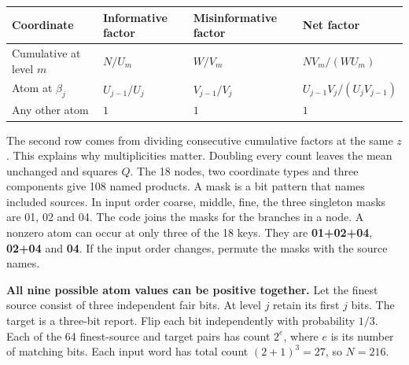 {\def\LTcaptype{none} %
\begin{longtable}[]{@{}
  >{\raggedright\arraybackslash}p{}
  >{\raggedright\arraybackslash}p{}
  >{\raggedright\arraybackslash}p{}
  >{\raggedright\arraybackslash}p{}@{}}
\toprule\noalign{}
\begin{minipage}[b]{\linewidth}\raggedright
Coordinate
\end{minipage} & \begin{minipage}[b]{\linewidth}\raggedright
Informative factor
\end{minipage} & \begin{minipage}[b]{\linewidth}\raggedright
Misinformative factor
\end{minipage} & \begin{minipage}[b]{\linewidth}\raggedright
Net factor
\end{minipage} \\
\midrule\noalign{}
\endhead
\bottomrule\noalign{}
\endlastfoot
Cumulative at level \(m\) & \(N/U_m\) & \(W/V_m\) & \(NV_m/(WU_m)\) \\
Atom at \(\beta_j\) & \(U_{j-1}/U_j\) & \(V_{j-1}/V_j\) & \(U_{j-1}V_j/(U_jV_{j-1})\) \\
Any other atom & \(1\) & \(1\) & \(1\) \\
\end{longtable}
}

The second row comes from dividing consecutive cumulative factors at the same \(z\). This explains why multiplicities matter. Doubling every count leaves the mean unchanged and squares \(Q\). The 18 nodes, two coordinate types and three components give 108 named products. A mask is a bit pattern that names included sources. In input order coarse, middle, fine, the three singleton masks are 01, 02 and 04. The code joins the masks for the branches in a node. A nonzero atom can occur at only three of the 18 keys. They are \textbf{01+02+04}, \textbf{02+04} and \textbf{04}. If the input order changes, permute the masks with the source names.

\textbf{All nine possible atom values can be positive together.} Let the finest source consist of three independent fair bits. At level \(j\) retain its first \(j\) bits. The target is a three-bit report. Flip each bit independently with probability \(1/3\). Each of the 64 finest-source and target pairs has count \(2^e\), where \(e\) is its number of matching bits. Each input word has total count \((2+1)^3=27\), so \(N=216\).

